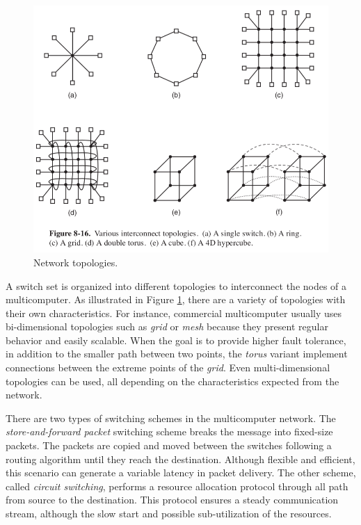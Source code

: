 				\begin{figure}[h]
					\centering
					\includegraphics[width=.8\textwidth]{images/net-topologies.png}

					\caption{
						Network topologies.
					}\par
					\label{fig.net-topologies}
				\end{figure}
				
				A switch set is organized into different topologies to interconnect
				the nodes of a multicomputer.
				As illustrated in Figure \ref{fig.net-topologies}, there are a
				variety of topologies with their own characteristics.
				For instance, commercial multicomputer usually uses bi-dimensional
				topologies such as \textit{grid} or \textit{mesh} because they present
				regular behavior and easily scalable.
				When the goal is to provide higher fault tolerance, in addition to the
				smaller path between two points, the \textit{torus} variant implement
				connections between the extreme points of the \textit{grid}.
				Even multi-dimensional topologies can be used, all depending on the
				characteristics expected from the network.

				There are two types of switching schemes in the multicomputer network.
				The \textit{store-and-forward packet} switching scheme breaks the message
				into fixed-size packets.
				The packets are copied and moved between the switches following a
				routing algorithm until they reach the destination.
				Although flexible and efficient, this scenario can generate a variable
				latency in packet delivery.
				The other scheme, called \textit{circuit switching}, performs a resource
				allocation protocol through all path from source to the destination.
				This protocol ensures a steady communication stream, although the
				slow start and possible sub-utilization of the resources.

